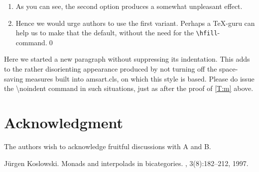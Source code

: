 \documentclass{lmcs} %
\theoremstyle{plain}\newtheorem{satz}[thm]{Satz} %
\begin{document}
\proof %
\begin{enumerate}%
\item
  As you can see, the second option produces a somewhat unpleasant effect.
\item
  Hence we would urge authors to use the first variant.  Perhaps a
  \TeX-guru can help us to make that the default, without the need for
  the \texttt{\textbackslash hfill}-command.\qed
\end{enumerate}

  Here we started a new paragraph without suppressing its
  indentation.  This adds to the rather disorienting appearance
  produced by not turning off the space-saving measures built into
  amsart.cls, on which this style is based.  Please do issue the
  \hbox{\textbackslash noindent} command in such situations, just as
  after the proof of \autoref{T:m} above.

\section*{Acknowledgment}
  \noindent The authors wish to acknowledge fruitful discussions with
  A and B.


\begin{thebibliography}{Kos97}

J{\"u}rgen Koslowski.
\newblock Monads and interpolads in bicategories.
, 3(8):182--212, 1997.

\end{thebibliography}

\appendix
\end{document}
